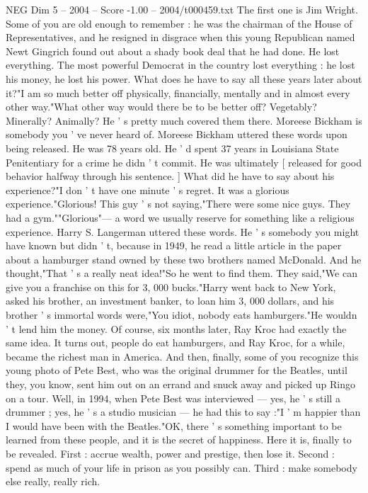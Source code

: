 \begin{textsample}{NEG Dim 5 – 2004 – Score -1.00 – 2004/t000459.txt}
The first one is Jim Wright.
Some of you are old enough to remember : he was the chairman of the House of Representatives, and he resigned in disgrace when this young Republican named Newt Gingrich found out about a shady book deal that he had done.
He lost everything.
The most powerful Democrat in the country lost everything : he lost his money, he lost his power.
What does he have to say all these years later about it?"I am so much better off physically, financially, mentally and in almost every other way."What other way would there be to be better off?
Vegetably?
Minerally?
Animally?
He ' s pretty much covered them there.
Moreese Bickham is somebody you ' ve never heard of.
Moreese Bickham uttered these words upon being released.
He was 78 years old.
He ' d spent 37 years in Louisiana State Penitentiary for a crime he didn ' t commit.
He was ultimately [ released for good behavior halfway through his sentence. ] What did he have to say about his experience?"I don ' t have one minute ' s regret.
It was a glorious experience."Glorious!
This guy ' s not saying,"There were some nice guys.
They had a gym.""Glorious"— a word we usually reserve for something like a religious experience.
Harry S.
Langerman uttered these words.
He ' s somebody you might have known but didn ' t, because in 1949, he read a little article in the paper about a hamburger stand owned by these two brothers named McDonald.
And he thought,"That ' s a really neat idea!"So he went to find them.
They said,"We can give you a franchise on this for 3, 000 bucks."Harry went back to New York, asked his brother, an investment banker, to loan him 3, 000 dollars, and his brother ' s immortal words were,"You idiot, nobody eats hamburgers."He wouldn ' t lend him the money.
Of course, six months later, Ray Kroc had exactly the same idea.
It turns out, people do eat hamburgers, and Ray Kroc, for a while, became the richest man in America.
And then, finally, some of you recognize this young photo of Pete Best, who was the original drummer for the Beatles, until they, you know, sent him out on an errand and snuck away and picked up Ringo on a tour.
Well, in 1994, when Pete Best was interviewed — yes, he ' s still a drummer ; yes, he ' s a studio musician — he had this to say :"I ' m happier than I would have been with the Beatles."OK, there ' s something important to be learned from these people, and it is the secret of happiness.
Here it is, finally to be revealed.
First : accrue wealth, power and prestige, then lose it.
Second : spend as much of your life in prison as you possibly can.
Third : make somebody else really, really rich.

\end{textsample}
